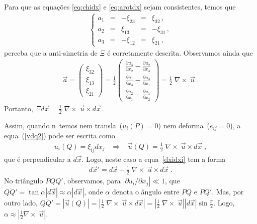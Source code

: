 Para que as equa\c{c}\~oes \ref{eq:chidx} e \ref{eq:arotdx} sejam consistentes, temos que
\begin{eqnarray}
\left\{
\begin{array}{ccccc}
a_1 & = & -\xi_{23} & = & \xi_{32} \, , \\
a_2 & = & \xi_{13} & = & -\xi_{31}\, ,  \\
a_3 & = & -\xi_{12} & = & \xi_{21} \, ,
\end{array} \right.
\end{eqnarray}
perceba que a anti-simetria de $\Xi$ \'e corretamente descrita.
Observamos ainda que
\begin{eqnarray}
\vec{a} = \left(
\begin{array}{c}
\xi_{32} \\
\xi_{13} \\
\xi_{21}
\end{array} \right)
= \frac{1}{2}  \left(
\begin{array}{c}
\frac{\partial u_3}{\partial x_2}-\frac{\partial u_2}
{\partial x_3}\\
\frac{\partial u_1}{\partial x_3}-\frac{\partial u_3}
{\partial x_1}\\
\frac{\partial u_2}{\partial x_1}-\frac{\partial u_1}
{\partial x_2}
\end{array} \right)
= \frac{1}{2} \; \nabla \times \; \vec{u} \; .
\end{eqnarray}
Portanto, $\Xi d\vec{x} = \frac{1}{2} \; \nabla \times
\;\vec{u} \times d\vec{x}$.

Assim, quando n\ao\ temos nem transla\cao\ ($u_i(P)=0$) nem deforma\cao\
($e_{ij}=0$), a equa\cao\ (\ref{vdq2}) pode ser escrita como
\begin{eqnarray}
u_i(Q) = \xi_{ij} dx_j \; \; \; \Longrightarrow \; \; \;
\vec{u}(Q) = \frac{1}{2} \;\nabla \times \; \vec{u}\times
d\vec{x} \; ,
\end{eqnarray}
que \'e perpendicular a $d\vec{x}$.
Logo, neste caso a equa\cao\ \ref{dxidxi}
tem a forma
\begin{eqnarray}
  d\vec{x}' = d\vec{x} + \frac{1}{2} \;\nabla \times \; \vec{u}\times
d\vec{x} \; .
\end{eqnarray}
No tri\^angulo $PQQ'$, observamos, para $|\partial u_i/\partial x_j|\ll 1$,
que $\overline{QQ'} = \tan \alpha |d\vec{x}| \approx
\alpha |d\vec{x}|$, onde $\alpha$ denota o \^angulo entre $PQ$ e $PQ'$.
Mas, por outro lado, $\overline{QQ'} = |\vec{u}(Q)|=
\mbox{$|\frac{1}{2} \; \nabla \times \; \vec{u} \times
d\vec{x}|$} = |\frac{1}{2} \; \nabla \times \; \vec{u}|
|d\vec{x}| \sin \frac{\pi}{2}$. Logo, $\alpha \approx
|\frac{1}{2} \nabla \times \; \vec{u}|$. 

